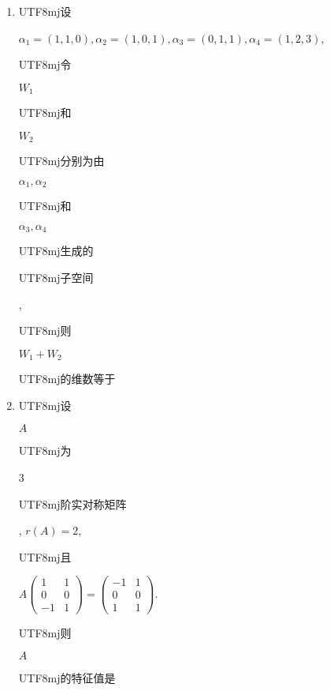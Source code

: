 \documentclass[10pt]{article}
\begin{document}
\begin{enumerate}
  \item \begin{CJK}{UTF8}{mj}设\end{CJK} $\alpha_{1}=(1,1,0), \alpha_{2}=(1,0,1), \alpha_{3}=(0,1,1), \alpha_{4}=(1,2,3)$, \begin{CJK}{UTF8}{mj}令\end{CJK} $W_{1}$ \begin{CJK}{UTF8}{mj}和\end{CJK} $W_{2}$ \begin{CJK}{UTF8}{mj}分别为由\end{CJK} $\alpha_{1}, \alpha_{2}$ \begin{CJK}{UTF8}{mj}和\end{CJK} $\alpha_{3}, \alpha_{4}$ \begin{CJK}{UTF8}{mj}生成的\end{CJK} \begin{CJK}{UTF8}{mj}子空间\end{CJK}, \begin{CJK}{UTF8}{mj}则\end{CJK} $W_{1}+W_{2}$ \begin{CJK}{UTF8}{mj}的维数等于\end{CJK}

  \item \begin{CJK}{UTF8}{mj}设\end{CJK} $A$ \begin{CJK}{UTF8}{mj}为\end{CJK} 3 \begin{CJK}{UTF8}{mj}阶实对称矩阵\end{CJK}, $r(A)=2$, \begin{CJK}{UTF8}{mj}且\end{CJK} $A\left(\begin{array}{cc}1 & 1 \\ 0 & 0 \\ -1 & 1\end{array}\right)=\left(\begin{array}{cc}-1 & 1 \\ 0 & 0 \\ 1 & 1\end{array}\right)$. \begin{CJK}{UTF8}{mj}则\end{CJK} $A$ \begin{CJK}{UTF8}{mj}的特征值是\end{CJK}


\end{enumerate}
\end{document}
